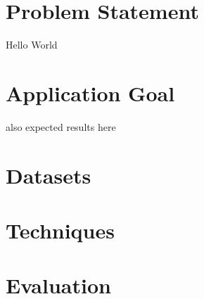 \section{Problem Statement}
Hello World

\section{Application Goal}
also expected results here

\section{Datasets}

\section{Techniques}

\section{Evaluation}


